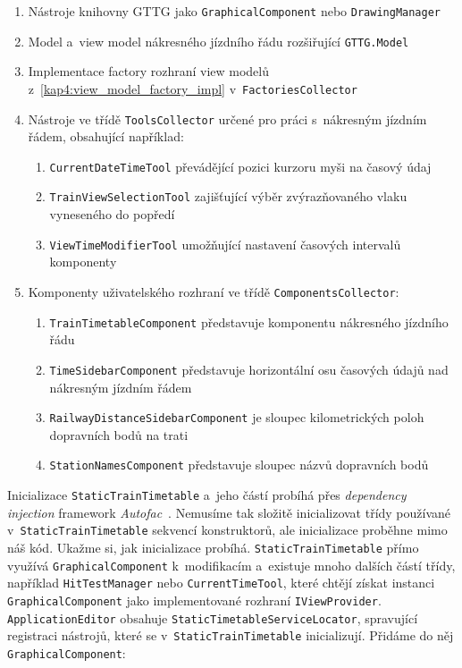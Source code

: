 \begin{enumerate}
	\item	Nástroje knihovny GTTG jako \texttt{GraphicalComponent} nebo \newline\texttt{DrawingManager}
	\item 	Model a~view model nákresného jízdního řádu rozšiřující \texttt{GTTG.Model}
	\item	Implementace factory rozhraní view modelů z~\ref{kap4:view_model_factory_impl} v~\texttt{FactoriesCollector}
	\item	Nástroje ve třídě \texttt{ToolsCollector} určené pro práci s~nákresným jízdním řádem, obsahující například:
			\begin{enumerate}
				\item \texttt{CurrentDateTimeTool} převádějící pozici kurzoru myši na časový údaj
				\item \texttt{TrainViewSelectionTool} zajišťující výběr zvýrazňovaného vlaku vyneseného do popředí
				\item \texttt{ViewTimeModifierTool} umožňující nastavení časových intervalů komponenty
			\end{enumerate}
	\item	Komponenty uživatelského rozhraní ve třídě \texttt{ComponentsCollector}:
			\begin{enumerate}
				\item \texttt{TrainTimetableComponent} představuje komponentu nákresného \linebreak jízdního řádu
				\item \texttt{TimeSidebarComponent} představuje horizontální osu časových údajů nad nákresným jízdním řádem
				\item \texttt{RailwayDistanceSidebarComponent} je sloupec kilometrických poloh dopravních bodů na trati
				\item \texttt{StationNamesComponent} představuje sloupec názvů dopravních bodů
			\end{enumerate}
\end{enumerate}

Inicializace \texttt{StaticTrainTimetable} a~jeho částí probíhá přes \textit{dependency injection} framework \textit{Autofac}~\cite{Autofac}. Nemusíme tak složitě inicializovat třídy používané v~\texttt{StaticTrainTimetable} sekvencí konstruktorů, ale inicializace proběhne mimo náš kód. Ukažme si, jak inicializace probíhá. \texttt{StaticTrainTimetable} přímo využívá \texttt{GraphicalComponent} k~modifikacím a~existuje mnoho dalších částí třídy, například \texttt{HitTestManager} nebo \texttt{CurrentTimeTool}, které chtějí získat instanci \texttt{GraphicalComponent} jako implementované rozhraní \texttt{IViewProvider}. \newline \texttt{ApplicationEditor} obsahuje \texttt{StaticTimetableServiceLocator}, spravující registraci nástrojů, které se v~\texttt{StaticTrainTimetable} inicializují. Přidáme do něj \texttt{GraphicalComponent}:

